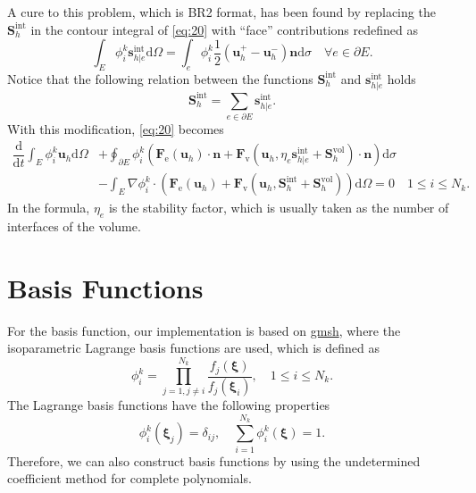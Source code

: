\documentclass{develop-note}
\begin{document}
A cure to this problem, which is BR2 format, has been found by replacing the $\mathbf{S}_{h}^{\mathrm{int}}$ in the contour integral of \autoref{eq:20} with ``face'' contributions redefined as
\begin{equation}
  \int_{E}\phi_{i}^{k}\mathbf{s}_{h|e}^{\mathrm{int}}\mathrm{d}\Omega=\int_{e}\phi_{i}^{k}\dfrac{1}{2}(\mathbf{u}_{h}^{+}-\mathbf{u}_{h}^{-})\mathbf{n}\mathrm{d}\sigma\quad\forall e \in\partial E.
\end{equation}
Notice that the following relation between the functions $\mathbf{S}_{h}^{\mathrm{int}}$ and $\mathbf{s}_{h|e}^{\mathrm{int}}$ holds
\begin{equation}
  \mathbf{S}_{h}^{\mathrm{int}}=\sum_{e\in\partial E}\mathbf{s}_{h|e}^{\mathrm{int}}.
\end{equation}
With this modification, \autoref{eq:20} becomes
\begin{equation}
  \label{eq:23}
  \begin{aligned}
    \dfrac{\mathrm{d}}{\mathrm{d}t}\int_{E}\phi_{i}^{k}\mathbf{u}_{h}\mathrm{d}\Omega &+\oint_{\partial E}\phi_{i}^{k}(\mathbf{F}_{\mathrm{e}}(\mathbf{u}_{h})\cdot\mathbf{n}+\mathbf{F}_{\mathrm{v}}(\mathbf{u}_{h},\eta_{e}\mathbf{s}_{h|e}^{\mathrm{int}}+\mathbf{S}_{h}^{\mathrm{vol}})\cdot\mathbf{n})\mathrm{d}\sigma\\
    &-\int_{E}\nabla\phi_{i}^{k}\cdot(\mathbf{F}_{\mathrm{e}}(\mathbf{u}_{h})+\mathbf{F}_{\mathrm{v}}(\mathbf{u}_{h},\mathbf{S}_{h}^{\mathrm{int}}+\mathbf{S}_{h}^{\mathrm{vol}}))\mathrm{d}\Omega=0\quad 1\leqslant i\leqslant N_{k}.
  \end{aligned}
\end{equation}
In the formula, $\eta_{e}$ is the stability factor, which is usually taken as the number of interfaces of the volume.

\section{Basis Functions}

For the basis function, our implementation is based on \href{https://gmsh.info}{gmsh}, where the isoparametric Lagrange basis functions are used, which is defined as
\begin{equation}
  \phi_{i}^{k}=\prod_{j=1,j\neq i}^{N_{k}}\dfrac{f_{j}(\bm{\xi})}{f_{j}(\bm{\xi}_{i})},\quad 1\leqslant i\leqslant N_{k}.
\end{equation}
The Lagrange basis functions have the following properties
\begin{equation}
  \phi_{i}^{k}(\bm{\xi}_{j})=\delta_{ij},\quad \sum_{i=1}^{N_{k}}\phi_{i}^{k}(\bm{\xi})=1.
\end{equation}
Therefore, we can also construct basis functions by using the undetermined coefficient method for complete polynomials.
\end{document}
